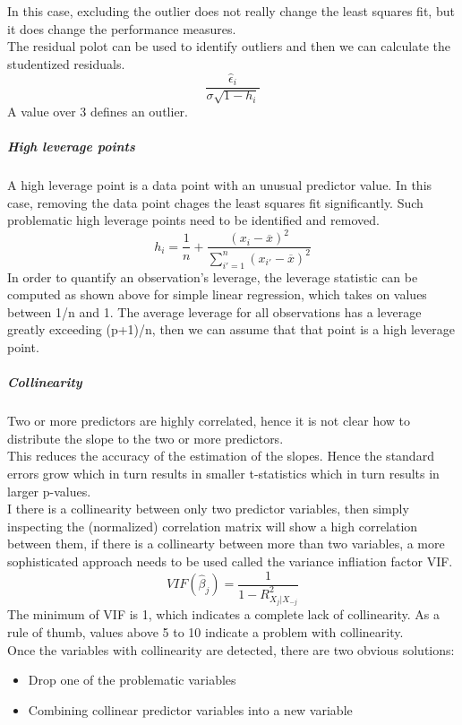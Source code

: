 \documentclass[../document.tex]{subfiles}
\begin{document}
	In this case, excluding the outlier does not really change the least squares fit, but it does change the performance measures.\\
	The residual polot can be used to identify outliers and then we can calculate the studentized residuals.
	\begin{equation}
	\frac{\hat{\epsilon}_{i}}{\sigma\sqrt{1-h_{i}}}
	\end{equation}
	A value over 3 defines an outlier.
	\subparagraph{High leverage points}
	A high leverage point is a data point with an unusual predictor value. In this case, removing the data point chages the least squares fit significantly. Such problematic high leverage points need to be identified and removed. \\
	\begin{equation}
		h_{i} = \frac{1}{n}+\frac{(x_{i}-\overline{x})^2}{\sum_{i'=1}^{n}(x_{i'}-\overline{x})^2}
	\end{equation}
	In order to quantify an observation's leverage, the leverage statistic can be computed as shown above for simple linear regression, which takes on values between 1/n and 1. The average leverage for all observations has a leverage greatly exceeding (p+1)/n, then we can assume that that point is a high leverage point.
	\subparagraph{Collinearity}
	Two or more predictors are highly correlated, hence it is not clear how to distribute the slope to the two or more predictors. \\
	This reduces the accuracy of the estimation of the slopes. Hence the standard errors grow which in turn results in smaller t-statistics which in turn results in larger p-values.\\
	I there is a collinearity between only two predictor variables, then simply inspecting the (normalized) correlation matrix will show a high correlation between them, if there is a collinearty between more than two variables, a more sophisticated approach needs to be used called the variance infliation factor VIF.
	\begin{equation}
		VIF(\hat{\beta}_{j})=\frac{1}{1-R^2_{X_{j}|X_{-j}}}
	\end{equation}	
	The minimum of VIF is 1, which indicates a complete lack of collinearity. As a rule of thumb, values above 5 to 10 indicate a problem with collinearity.\\
	Once the variables with collinearity are detected, there are two obvious solutions:
	\begin{itemize}
		\item Drop one of the problematic variables
		\item Combining collinear predictor variables into a new variable
	\end{itemize}
\end{document}
